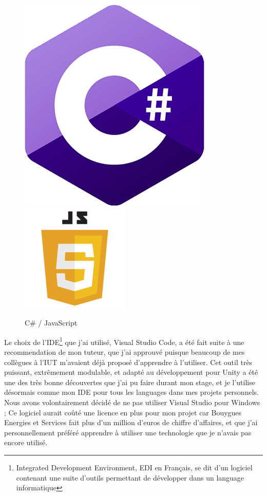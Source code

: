 \documentclass[a4paper]{article}
\begin{document}
    \begin{figure}[H]
        \centering
        \includegraphics[scale=0.35]{img/logo-csharp}
        \hspace{10pt}
        \includegraphics[scale=0.75]{img/logo-javascript}
        \caption{C\# / JavaScript}
    \end{figure}

    Le choix de l'IDE\footnote{Integrated Development Environment, EDI en Français, se dit d'un logiciel contenant une suite d'outils permettant de développer dans un language informatique} que j'ai utilisé, Visual Studio Code, a été fait suite à une recommendation de mon tuteur, que j'ai approuvé puisque beaucoup de mes collègues à l'IUT m'avaient déjà proposé d'apprendre à l'utiliser. Cet outil très puissant, extrêmement modulable, et adapté au développement pour Unity a été une des très bonne découvertes que j'ai pu faire durant mon stage, et je l'utilise désormais comme mon IDE pour tous les languages dans mes projets personnels. Nous avons volontairement décidé de ne pas utiliser Visual Studio pour Windows ; Ce logiciel aurait coûté une licence en plus pour mon projet car Bouygues Energies et Services fait plus d'un million d'euros de chiffre d'affaires, et que j'ai personnellement préféré apprendre à utiliser une technologie que je n'avais pas encore utilisé. \\
\end{document}
